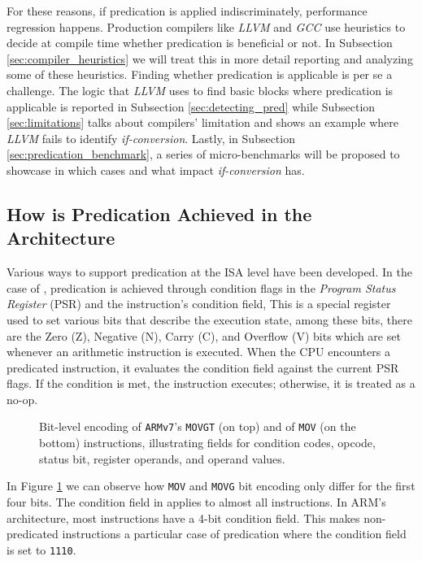 For these reasons, if predication is applied indiscriminately, performance regression happens. Production compilers like \textit{LLVM} and \textit{GCC} use heuristics to decide at compile time whether predication is beneficial or not. In Subsection \ref{sec:compiler_heuristics} we will treat this in more detail reporting and analyzing some of these heuristics. Finding whether predication is applicable is per se a challenge. The logic that \textit{LLVM} uses to find basic blocks where predication is applicable is reported in Subsection \ref{sec:detecting_pred} while Subsection \ref{sec:limitations} talks about compilers' limitation and shows an example where \textit{LLVM} fails to identify \textit{if-conversion}. Lastly, in Subsection \ref{sec:predication_benchmark}, a series of micro-benchmarks will be proposed to showcase in which cases and what impact \textit{if-conversion} has.

\subsection{How is Predication Achieved in the Architecture}
\label{sec:arch_support}
Various ways to support predication at the ISA level have been developed. In the case of \armvs, predication is achieved through condition flags in the \textit{Program Status Register} (PSR) and the instruction’s condition field,
This is a special register used to set various bits that describe the execution state, among these bits, there are the Zero (Z), Negative (N), Carry (C), and Overflow (V) bits which are set whenever an arithmetic instruction is executed.
When the CPU encounters a predicated instruction, it evaluates the condition field against the current PSR flags. If the condition is met, the instruction executes; otherwise, it is treated as a no-op.

\begin{figure}[H]
    \centering
    
    
    \caption[\texttt{ARMv7}'s Bit-level Encoding]{Bit-level encoding of \texttt{ARMv7}'s \texttt{MOVGT} (on top) and of \texttt{MOV} (on the bottom) instructions, illustrating fields for condition codes, opcode, status bit, register operands, and operand values.}
    \label{fig:mov_encoding}
\end{figure}

In Figure \ref{fig:mov_encoding} we can observe how \texttt{MOV} and \texttt{MOVG} bit encoding only differ for the first four bits. The condition field in \armvs applies to almost all instructions. In ARM's architecture, most instructions have a 4-bit condition field. This makes non-predicated instructions a particular case of predication where the condition field is set to \texttt{1110}. \\

